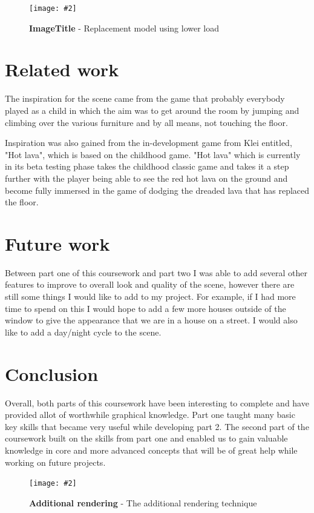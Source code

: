 \documentclass[10pt, a4paper]{article}
\newcommand{\figuremacro}[5]{
    \begin{figure}[#1]
        \centering
        \texttt{[image: \#2]}
        \caption[#3]{\textbf{#3}#4}
        \label{fig:#2}
    \end{figure}
}
\begin{document}
\figuremacro{h}{replacementloadcontent.png}{ImageTitle}{ - Replacement model using lower load}{0.8}


\section{Related work}

The inspiration for the scene came from the game that
probably everybody played as a child in which the aim
was to get around the room by jumping and climbing over
the various furniture and by all means, not touching the
floor.

Inspiration was also gained from the in-development
game from Klei entitled, "Hot lava", which is based on
the childhood game. "Hot lava" which is currently in its
beta testing phase takes the childhood classic game and
takes it a step further with the player being able to see the
red hot lava on the ground and become fully immersed in
the game of dodging the dreaded lava that has replaced
the floor.

\section{Future work}
Between part one of this coursework and part two I was able to add several other features to improve to overall look and quality of the scene, however there are still some things
I would like to add to my project. For example, if I had more time to spend on this I would hope to add a few more houses outside of the window to give the appearance that we are in a house on a street.
I would also like to add a day/night cycle to the scene.
\section{Conclusion}

Overall, both parts of this coursework have been interesting to complete and have provided allot of worthwhile graphical knowledge. Part one taught many basic key skills that became very useful while developing part 2. The second part of the coursework built on the skills from part one and enabled us to gain valuable knowledge in core and more advanced concepts that will be of great help while working on future projects. 
\figuremacro{h}{additional.png}{Additional rendering}{ - The additional rendering technique}{1.0} 	


		
\end{document}
